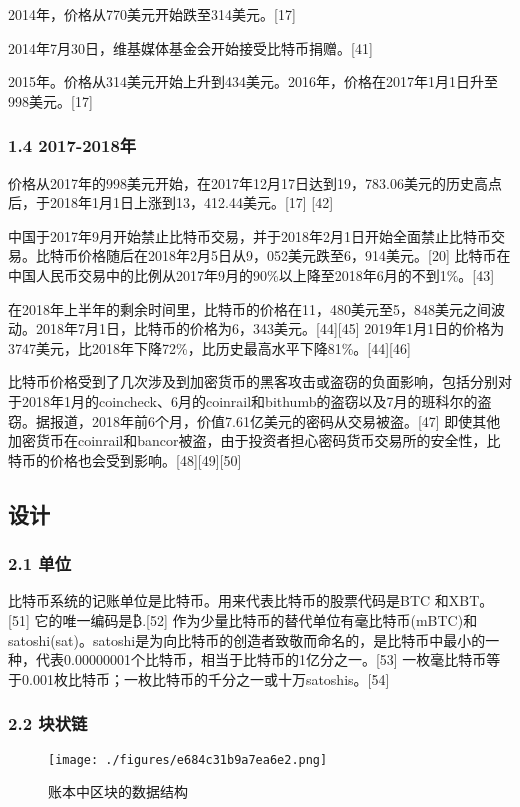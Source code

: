 2014年，价格从770美元开始跌至314美元。[17]

2014年7月30日，维基媒体基金会开始接受比特币捐赠。[41]

2015年。价格从314美元开始上升到434美元。2016年，价格在2017年1月1日升至998美元。[17]
\subsubsection{1.4 2017-2018年}
价格从2017年的998美元开始，在2017年12月17日达到19，783.06美元的历史高点后，于2018年1月1日上涨到13，412.44美元。[17] [42]

中国于2017年9月开始禁止比特币交易，并于2018年2月1日开始全面禁止比特币交易。比特币价格随后在2018年2月5日从9，052美元跌至6，914美元。[20] 比特币在中国人民币交易中的比例从2017年9月的90\%以上降至2018年6月的不到1\%。[43]

在2018年上半年的剩余时间里，比特币的价格在11，480美元至5，848美元之间波动。2018年7月1日，比特币的价格为6，343美元。[44][45] 2019年1月1日的价格为3747美元，比2018年下降72\%，比历史最高水平下降81\%。[44][46]

比特币价格受到了几次涉及到加密货币的黑客攻击或盗窃的负面影响，包括分别对于2018年1月的coincheck、6月的coinrail和bithumb的盗窃以及7月的班科尔的盗窃。据报道，2018年前6个月，价值7.61亿美元的密码从交易被盗。[47] 即使其他加密货币在coinrail和bancor被盗，由于投资者担心密码货币交易所的安全性，比特币的价格也会受到影响。[48][49][50]

\subsection{设计}
\subsubsection{2.1 单位}
比特币系统的记账单位是比特币。用来代表比特币的股票代码是BTC 和XBT。[51] 它的唯一编码是₿.[52] 作为少量比特币的替代单位有毫比特币(mBTC)和satoshi(sat)。satoshi是为向比特币的创造者致敬而命名的，是比特币中最小的一种，代表0.00000001个比特币，相当于比特币的1亿分之一。[53] 一枚毫比特币等于0.001枚比特币；一枚比特币的千分之一或十万satoshis。[54]
\subsubsection{2.2 块状链}
\begin{figure}[ht]
\centering
\texttt{[image: ./figures/e684c31b9a7ea6e2.png]}
\caption{账本中区块的数据结构} \label{fig_BTC_1}
\end{figure}